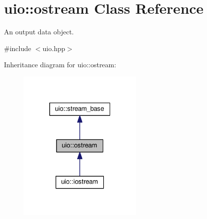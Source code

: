 \hypertarget{classuio_1_1ostream}{}\section{uio\+:\+:ostream Class Reference}
\label{classuio_1_1ostream}


An output data object.  




{\ttfamily \#include $<$uio.\+hpp$>$}



Inheritance diagram for uio\+:\+:ostream\+:\nopagebreak
\begin{figure}[H]
\begin{center}
\leavevmode
\includegraphics[width=172pt]{classuio_1_1ostream__inherit__graph}
\end{center}
\end{figure}
